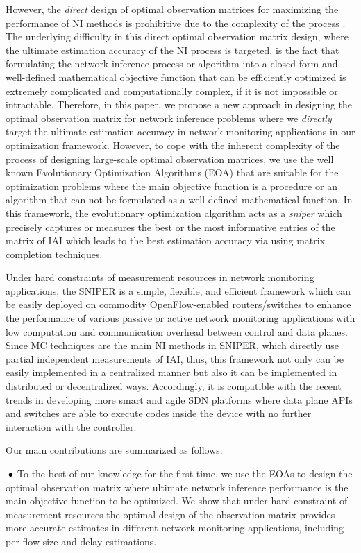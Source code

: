 However, the \emph{direct} design of optimal observation matrices for maximizing the performance of NI methods is prohibitive due to the complexity of the process \cite{IF14iSTAMP:2014}\cite{Elad:2007}. The underlying difficulty in this direct optimal observation matrix design, where the ultimate estimation accuracy of the NI process is targeted, is the fact that formulating the network inference process or algorithm into a closed-form and well-defined mathematical objective function that can be efficiently optimized is extremely complicated and computationally complex, if it is not impossible or intractable. Therefore, in this paper, we propose a new approach in designing the optimal observation matrix for network inference problems where we \emph{directly} target the ultimate estimation accuracy in network monitoring applications in our optimization framework. However, to cope with the inherent complexity of the process of designing large-scale optimal observation matrices, we use the well known Evolutionary Optimization Algorithms (EOA) that are suitable for the optimization problems where the main objective function is a procedure or an algorithm that can not be formulated as a well-defined mathematical function. In this framework, the evolutionary optimization algorithm acts as a \emph{sniper} which precisely captures or measures the best or the most informative entries of the matrix of IAI which leads to the best estimation accuracy via using matrix completion techniques. 

Under hard constraints of measurement resources in network monitoring applications, the SNIPER is a simple, flexible, and efficient framework which can be easily deployed on commodity OpenFlow-enabled routers/switches to enhance the performance of various passive or active network monitoring applications with low computation and communication overhead between control and data planes. Since MC techniques are the main NI methods in SNIPER, which directly use partial independent measurements of IAI, thus, this framework not only can be easily implemented in a centralized manner but also it can be implemented in distributed or decentralized ways. Accordingly, it is compatible with the recent trends in developing more smart and agile SDN platforms \cite{Bianchi:2014}\cite{Moshref:2014} where data plane APIs and switches are able to execute codes inside the device with no further interaction with the controller. 

Our main contributions are summarized as follows:

\textbf{$\text{\hspace{0.1cm}}\bullet$} To the best of our knowledge for the first time, we use the EOAs to design the optimal observation matrix where ultimate network inference performance is the main objective function to be optimized. We show that under hard constraint of measurement resources the optimal design of the observation matrix provides more accurate estimates in different network monitoring applications, including per-flow size and delay estimations.

